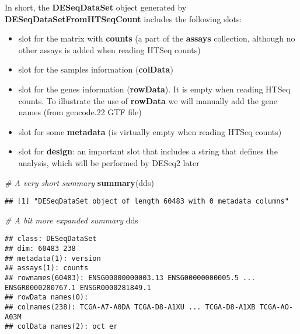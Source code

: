 \documentclass[]{book}
\newenvironment{Shaded}{\begin{snugshade}}{\end{snugshade}}
\newcommand{\KeywordTok}[1]{\textcolor[rgb]{0.13,0.29,0.53}{\textbf{#1}}}
\newcommand{\CommentTok}[1]{\textcolor[rgb]{0.56,0.35,0.01}{\textit{#1}}}
\newcommand{\NormalTok}[1]{#1}
\providecommand{\tightlist}{%
  \setlength{\itemsep}{0pt}\setlength{\parskip}{0pt}}
\begin{document}
In short, the \textbf{DESeqDataSet} object generated by
\textbf{DESeqDataSetFromHTSeqCount} includes the following slots:

\begin{itemize}
\tightlist
\item
  slot for the matrix with \textbf{counts} (a part of the
  \textbf{assays} collection, although no other assays is added when
  reading HTSeq counts)\\
\item
  slot for the samples information (\textbf{colData})\\
\item
  slot for the genes information (\textbf{rowData}). It is empty when
  reading HTSeq counts. To illustrate the use of \textbf{rowData} we
  will manually add the gene names (from gencode.22 GTF file)\\
\item
  slot for some \textbf{metadata} (is virtually empty when reading HTSeq
  counts)\\
\item
  slot for \textbf{design}: an important slot that includes a string
  that defines the analysis, which will be performed by DESeq2 later
\end{itemize}

\begin{Shaded}
\begin{Highlighting}[]
\CommentTok{# A very short summary}
\KeywordTok{summary}\NormalTok{(dds)}
\end{Highlighting}
\end{Shaded}

\begin{verbatim}
## [1] "DESeqDataSet object of length 60483 with 0 metadata columns"
\end{verbatim}

\begin{Shaded}
\begin{Highlighting}[]
\CommentTok{# A bit more expanded summary}
\NormalTok{dds}
\end{Highlighting}
\end{Shaded}

\begin{verbatim}
## class: DESeqDataSet 
## dim: 60483 238 
## metadata(1): version
## assays(1): counts
## rownames(60483): ENSG00000000003.13 ENSG00000000005.5 ... ENSGR0000280767.1 ENSGR0000281849.1
## rowData names(0):
## colnames(238): TCGA-A7-A0DA TCGA-D8-A1XU ... TCGA-D8-A1XB TCGA-AO-A03M
## colData names(2): oct er
\end{verbatim}
\end{document}
